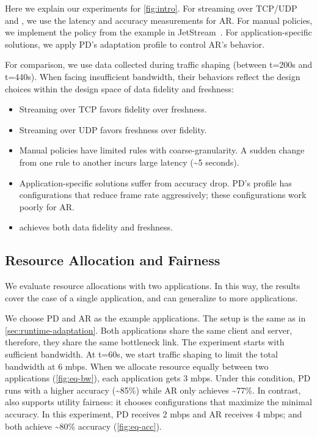  Here we explain our experiments for
\autoref{fig:intro}. For streaming over TCP/UDP and \sysname{}, we use the
latency and accuracy measurements for AR\@. For manual policies, we implement the
policy from the example in JetStream~\cite{rabkin2014aggregation}. For
application-specific solutions, we apply PD's adaptation profile to control AR's
behavior.

For comparison, we use data collected during traffic shaping (between t=200s and
t=440s). When facing insufficient bandwidth, their behaviors reflect
the design choices within the design space of data fidelity and freshness:

\begin{itemize}[leftmargin=*]
\item Streaming over TCP favors fidelity over freshness.
\item Streaming over UDP favors freshness over fidelity.
\item Manual policies have limited rules with coarse-granularity. A sudden
  change from one rule to another incurs large latency (\textasciitilde 5
  seconds).
\item Application-specific solutions suffer from accuracy drop. PD's profile has
  configurations that reduce frame rate aggressively; these configurations work
  poorly for AR\@.
\item \sysname{} achieves both data fidelity and freshness.
\end{itemize}

\subsection{Resource Allocation and Fairness}
\label{sec:multi-task-alloc}

We evaluate resource allocations with two applications. In this way, the results
cover the case of a single application, and can generalize to more applications.

We choose PD and AR as the example applications. The setup is the same as in \autoref{sec:runtime-adaptation}. 
Both applications share the same client and server, therefore, they
share the same bottleneck link. The experiment starts with sufficient
bandwidth. At t=60s, we start traffic shaping to limit the total bandwidth
at 6 mbps. When we allocate resource equally between two applications
(\autoref{fig:eq-bw}), each application gets 3 mbps. Under this condition,
PD runs with a higher accuracy (\textasciitilde 85\%) while AR only achieves
\textasciitilde 77\%. In contrast, \sysname{} also supports utility fairness: it
chooses configurations that maximize the minimal accuracy. In this experiment,
PD receives 2 mbps and AR receives 4 mbps; and both achieve \textasciitilde 80\%
accuracy (\autoref{fig:eq-acc}).

